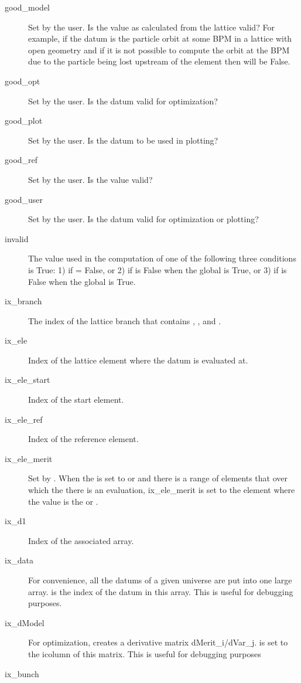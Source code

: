 \begin{description}
  \item[good_model] \Newline
Set by the user. Is the value as calculated from the  lattice valid? For example, if the
datum is the particle orbit at some BPM in a lattice with open geometry and if it is not possible to
compute the orbit at the BPM due to the particle being lost upstream of the element then
 will be False.
  \item[good_opt] \Newline
Set by the user. Is the datum valid for optimization?
  \item[good_plot] \Newline
Set by the user. Is the datum to be used in plotting?
  \item[good_ref] \Newline
Set by the user. Is the  value valid?
  \item[good_user] \Newline
Set by the user. Is the datum valid for optimization or plotting?
  \item[invalid] \Newline
The value used in the computation of  one of the following three conditions is
True: 1) if  = False, or 2) if  is False when the global 
is True, or 3) if  is False when the global  is True.
  \item[ix_branch] \Newline
The index of the lattice branch that contains , , and .
  \item[ix_ele] \Newline
Index of the lattice element where the datum is evaluated at. 
  \item[ix_ele_start] \Newline
Index of the start element.
  \item[ix_ele_ref] \Newline
Index of the reference element.
  \item[ix_ele_merit] \Newline
Set by \tao. When the  is set to  or  and there is a range
of elements that over which the there is an evaluation, ix_ele_merit is set to the element
where the value is the  or .
  \item[ix_d1] \Newline
Index of the associated  array.
  \item[ix_data] \Newline
For convenience, all the datums of a given universe are put into one large array.  is the index
of the datum in this array. This is useful for debugging purposes.
  \item[ix_dModel] \Newline
For optimization, \tao creates a derivative matrix dMerit_i/dVar_j.  is set
to the i\Th column of this matrix. This is useful for debugging purposes
  \item[ix_bunch] \Newline

\end{description}
